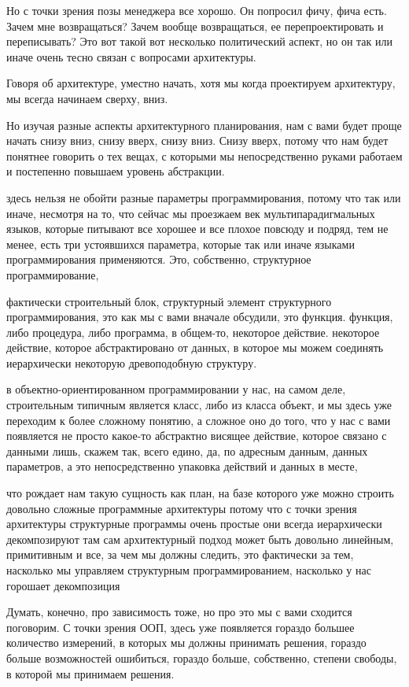 Но с точки зрения позы менеджера все хорошо. Он попросил фичу, фича есть. Зачем мне возвращаться? Зачем вообще возвращаться, ее перепроектировать и переписывать? Это вот такой вот несколько политический аспект, но он так или иначе очень тесно связан с вопросами архитектуры.

Говоря об архитектуре, уместно начать, хотя мы когда проектируем архитектуру, мы всегда начинаем сверху, вниз.

Но изучая разные аспекты архитектурного планирования, нам с вами будет проще начать снизу вниз, снизу вверх, снизу вниз. Снизу вверх, потому что нам будет понятнее говорить о тех вещах, с которыми мы непосредственно руками работаем и постепенно повышаем уровень абстракции.

здесь нельзя не обойти разные параметры программирования, потому что так или иначе, несмотря на то, что сейчас мы проезжаем век мультипарадигмальных языков, которые питывают все хорошее и все плохое повсюду и подряд, тем не менее, есть три устоявшихся параметра, которые так или иначе языками программирования применяются. Это, собственно, структурное программирование,

фактически строительный блок, структурный элемент структурного программирования, это как мы с вами вначале обсудили, это функция. функция, либо процедура, либо программа, в общем-то, некоторое действие. некоторое действие, которое абстрактировано от данных, в которое мы можем соединять иерархически некоторую древоподобную структуру.

в объектно-ориентированном программировании у нас, на самом деле, строительным типичным является класс, либо из класса объект, и мы здесь уже переходим к более сложному понятию, а сложное оно до того, что у нас с вами появляется не просто какое-то абстрактно висящее действие, которое связано с данными лишь, скажем так, всего едино, да, по адресным данным, данных параметров, а это непосредственно упаковка действий и данных в месте,

что рождает нам такую сущность как план, на базе которого уже можно строить довольно сложные программные архитектуры потому что с точки зрения архитектуры структурные программы очень простые они всегда иерархически декомпозируют там сам архитектурный подход может быть довольно линейным, примитивным и все, за чем мы должны следить, это фактически за тем, насколько мы управляем структурным программированием, насколько у нас горошает декомпозиция

Думать, конечно, про зависимость тоже, но про это мы с вами сходится поговорим. С точки зрения ООП, здесь уже появляется гораздо большее количество измерений, в которых мы должны принимать решения, гораздо больше возможностей ошибиться, гораздо больше, собственно, степени свободы, в которой мы принимаем решения.

